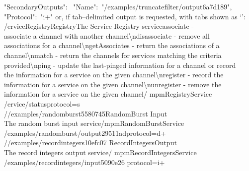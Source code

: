 "SecondaryOutputs":\ \openSq{} \textbraceleft{} "Name":\ 
"/examples/truncatefilter/output\textunderscore{}6a7d189",\\
"Protocol":\ "i+" \textbraceright{} \closeSq{} \textbraceright{} \closeSq
\outputEnd{}
or, if tab--delimited output is requested, with tabs shown as
`\texttt{\boldmath{$\vdash$}}':
\outputBegin{}
/\textdollar{}ervice\pseudotab{}Registry\pseudotab{}Registry\pseudotab{}The Service
Registry service\pseudotab{}associate - \\
associate a channel with another channel\textbackslash{}ndisassociate - remove all\\
associations for a channel\textbackslash{}ngetAssociates - return the associations of a\\
channel\textbackslash{}nmatch - return the channels for services matching the criteria\\
provided\textbackslash{}nping - update the last-pinged information for a channel or
record\\
the information for a service on the given channel\textbackslash{}nregister - record the\\
information for a service on the given channel\textbackslash{}nunregister - remove the\\
information for a service on the given channel\pseudotab\textellipsis/%
mpmRegistryService\pseudotwotabs\\
/\textdollar{}ervice/status\textbraceleft{}protocol=s\textbraceright\\

/\serviceName/examples/randomburst\textunderscore{}5580745\pseudotab{}RandomBurst%
\pseudotab{}Input\pseudotab\\
The random burst input service\pseudotwotabs\textellipsis/mpmRandomBurstService%
\pseudotwotabs\\
/examples/randomburst/output\textunderscore{}29511ad\textbraceleft{}protocol=d+%
\textbraceright\\

/\serviceName/examples/recordintegers\textunderscore{}10efc07\pseudotab{}%
RecordIntegers\pseudotab{}Output\pseudotab\\
The record integers output service\pseudotwotabs\textellipsis/%
mpmRecordIntegersService\pseudotab\\
/examples/recordintegers/input\textunderscore{}5090e26\textbraceleft{}%
protocol=i+\textbraceright\\

